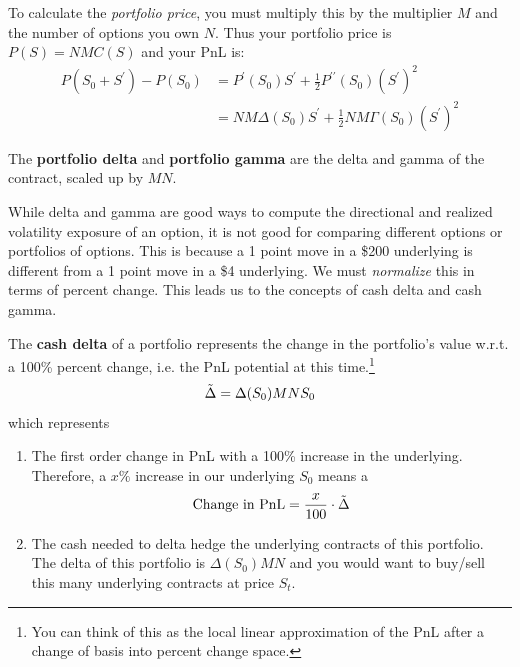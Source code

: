 \documentclass{article}
\begin{document}
    To calculate the \textit{portfolio price}, you must multiply this by the multiplier $M$ and the number of options you own $N$. Thus your portfolio price is $P(S) = N M C(S)$ and your PnL is: 
    \begin{align}
      P(S_0 + S^\prime) - P(S_0) & = P^\prime (S_0) S^\prime + \frac{1}{2} P^{\prime\prime} (S_0) (S^\prime)^2 \\
                                 & = N M \Delta(S_0) S^\prime + \frac{1}{2} N M \Gamma(S_0) (S^\prime)^2
    \end{align}

    \begin{definition}
      The \textbf{portfolio delta} and \textbf{portfolio gamma} are the delta and gamma of the contract, scaled up by $MN$.
    \end{definition}

    While delta and gamma are good ways to compute the directional and realized volatility exposure of an option, it is not good for comparing different options or portfolios of options. This is because a 1 point move in a \$200 underlying is different from a 1 point move in a \$4 underlying. We must \textit{normalize} this in terms of percent change. This leads us to the concepts of cash delta and cash gamma. 

    \begin{definition}
      The \textbf{cash delta} of a portfolio represents the change in the portfolio's value w.r.t. a 100\% percent change, i.e. the PnL potential at this time.\footnote{You can think of this as the local linear approximation of the PnL after a change of basis into percent change space. }
      \begin{equation}
        \Tilde{\Delta} = \Delta(S_0) M N S_0 
      \end{equation}
      which represents
      \begin{enumerate}
        \item The first order change in PnL with a 100\% increase in the underlying. Therefore, a $x\%$ increase in our underlying $S_0$ means a
          \begin{equation}
            \text{Change in PnL} = \frac{x}{100} \cdot \Tilde{\Delta}
          \end{equation}
        \item The cash needed to delta hedge the underlying contracts of this portfolio. The delta of this portfolio is $\Delta(S_0) M N$ and you would want to buy/sell this many underlying contracts at price $S_t$.
      \end{enumerate}
    \end{definition}
\end{document}
